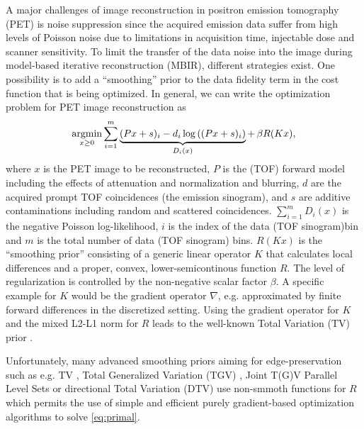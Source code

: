 A major challenges of image reconstruction in positron emission tomography (PET)
is noise suppression since the acquired emission data suffer from high levels of Poisson
noise due to limitations in acquisition time, injectable dose and scanner sensitivity.
To limit the transfer of the data noise into the image during model-based iterative
reconstruction (MBIR), different strategies exist. 
One possibility is to add a ``smoothing'' prior to the data fidelity term in the cost
function that is being optimized.
In general, we can write the optimization problem for PET image reconstruction as
%
\begin{equation}
\operatorname*{argmin} _{x\geq 0} \sum_{i=1}^{m} \underbrace{(Px + s)_i -  d_i \log \left( (Px + s)_i \right)}_{D_i(x)} + \, \beta R(Kx),
\label{eq:primal}
\end{equation}
%
where $x$ is the PET image to be reconstructed, $P$ is the (TOF) forward model including the effects
of attenuation and normalization and blurring, $d$ are the acquired prompt TOF coincidences 
(the emission sinogram), and $s$ are additive contaminations including random and 
scattered coincidences. 
$\sum_{i=1}^m D_i(x)$ is the negative Poisson log-likelihood, $i$ is the index of the data (TOF sinogram)bin and $m$ is the total number of data (TOF sinogram) bins.
$R(Kx)$ is the ``smoothing prior'' consisting of a generic linear operator $K$ that calculates 
local differences and a proper, convex, lower-semicontinous function $R$.
The level of regularization is controlled by the non-negative scalar factor $\beta$.
A specific example for $K$ would be the gradient operator $\nabla$, e.g. approximated by finite forward 
differences in the discretized setting.
Using the gradient operator for $K$ and the mixed L2-L1 norm for $R$ leads to the well-known 
Total Variation (TV) prior \cite{Rudin1992}.

Unfortunately, many advanced smoothing priors aiming for edge-preservation 
such as e.g. TV \cite{Rudin1992}, Total Generalized Variation (TGV) 
\cite{Bredies2010}, Joint T(G)V \cite{Rigie2015,Knoll2016}
Parallel Level Sets \cite{Ehrhardt2016a,Schramm2017} or directional Total Variation (DTV)
\cite{Ehrhardt2016} use non-smmoth functions for $R$ which permits the use of simple and efficient 
purely gradient-based optimization algorithms to solve \eqref{eq:primal}.

